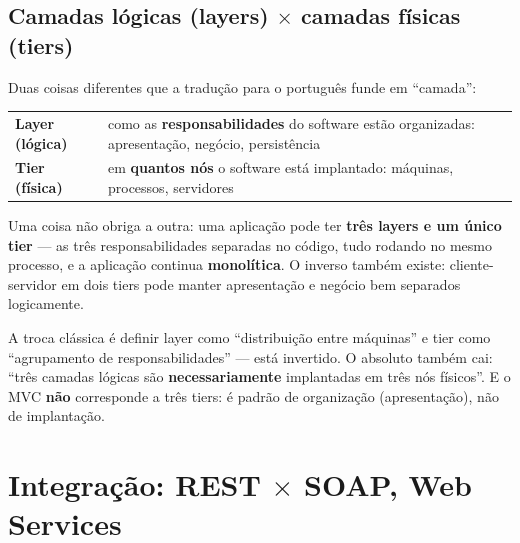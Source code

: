 \subsection{Camadas lógicas (layers) $\times$ camadas físicas (tiers)}

Duas coisas diferentes que a tradução para o português funde em ``camada'':

\begin{center}
\begin{tabular}{@{}p{3.4cm}p{8.6cm}@{}}
\toprule
\textbf{Layer (lógica)} & como as \textbf{responsabilidades} do software estão organizadas: apresentação, negócio, persistência \\
\textbf{Tier (física)} & em \textbf{quantos nós} o software está implantado: máquinas, processos, servidores \\
\bottomrule
\end{tabular}
\end{center}

Uma coisa não obriga a outra: uma aplicação pode ter \textbf{três layers e um
único tier} --- as três responsabilidades separadas no código, tudo rodando no
mesmo processo, e a aplicação continua \textbf{monolítica}. O inverso também
existe: cliente-servidor em dois tiers pode manter apresentação e negócio bem
separados logicamente.

\begin{pegadinha}
A troca clássica é definir layer como ``distribuição entre máquinas'' e tier
como ``agrupamento de responsabilidades'' --- está invertido. O absoluto
também cai: ``três camadas lógicas são \textbf{necessariamente} implantadas em
três nós físicos''. E o MVC \textbf{não} corresponde a três tiers: é padrão de
organização (apresentação), não de implantação.
\end{pegadinha}

\section{Integração: REST $\times$ SOAP, Web Services}

